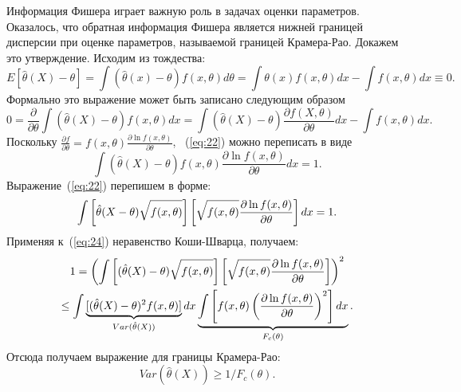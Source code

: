 Информация Фишера играет важную роль в задачах оценки параметров.
Оказалось, что обратная информация Фишера является нижней границей дисперсии при оценке параметров, называемой границей Крамера-Рао.
Докажем это утверждение.
%
Исходим из тождества:
%
\begin{equation}\label{eq:21}
  E[\hat{\theta}(X) - \theta] 
  = \int(\hat{\theta}(x) - \theta)f(x,\theta)d\theta 
  = \int\theta(x)f(x,\theta)dx - \int f(x,\theta)dx \equiv 0.
\end{equation}
%
Формально это выражение может быть записано следующим образом
%
\begin{equation}\label{eq:22}
  0 = \frac{\partial}{\partial \theta}
    \int(\hat{\theta}(X) - \theta)f(x,\theta)dx
  = \int(\hat{\theta}(X) - \theta)
    \frac{\partial f(X, \theta)}{\partial \theta}dx - \int f(x,\theta)dx.
\end{equation}
%
Поскольку $\frac{\partial f}{\partial \theta} = f(x,\theta)
    \frac{\partial \ln f(x,\theta)}{\partial \theta}$,
~(\ref{eq:22}) можно переписать в виде
%
\begin{equation}
    \label{eq:23}
        \int(\hat{\theta}(X) - \theta)
            f(x,\theta) \frac{\partial \ln f(x,\theta)}
        {\partial \theta}dx = 1.
\end{equation}
%
Выражение~(\ref{eq:22}) перепишем в форме:
%
\begin{equation}
    \label{eq:24}
        \int \left[\hat{\theta}(X-\theta)\Large \sqrt{\mathstrut f(x,\theta)}\right]
            \left[\Large\sqrt{\mathstrut f(x,\theta)}
                \frac{\partial \ln f(x,\theta)}{\partial \theta}\right]dx = 1.
\end{equation}
%
Применяя к~(\ref{eq:24}) неравенство Коши-Шварца, получаем:
%
\begin{multline}
    \label{eq:25}
        1 = \left( \int \left[(\hat{\theta}(X)-\theta)
            \Large \sqrt{\mathstrut f(x,\theta)}\right]
                \left[\Large \sqrt{\mathstrut f(x,\theta)}
                    \frac{\partial \ln f(x,\theta)}{\partial \theta} \right]
                 \right)^2 \\
                \leq \int
            \underbrace{[(\hat{\theta}(X) - \theta)^2 f(x,\theta)]}_{Var(\hat{\theta}(X))}dx
        \underbrace{\int\left[f(x,\theta)\left( \frac{\partial \ln f(x,\theta)}
    {\partial \theta} \right)^2 \right]dx}_{F_c(\theta)}.
\end{multline}
%
Отсюда получаем выражение для границы Крамера-Рао:
%
\begin{equation}
    \label{eq:26}
        Var(\hat{\theta}(X)) \geq 1/{F_c (\theta)}.
\end{equation}




